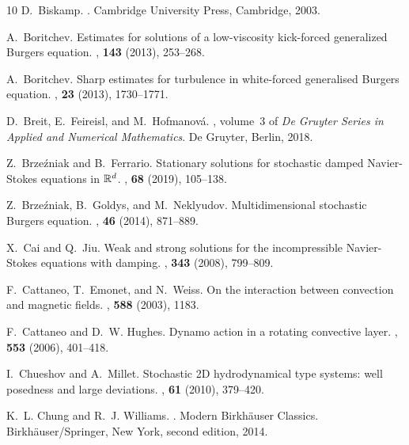 \documentclass[11pt, reqno]{amsart}
\theoremstyle{definition}
\numberwithin{equation}{section}
\begin{document}
\begin{thebibliography}{10}
	D.~Biskamp.
	.
	\newblock Cambridge University Press, Cambridge, 2003.
	
	A.~Boritchev.
	\newblock Estimates for solutions of a low-viscosity kick-forced generalized
	{B}urgers equation.
	,  {\bf 143} (2013), 253--268.
	
	A.~Boritchev.
	\newblock Sharp estimates for turbulence in white-forced generalised {B}urgers
	equation.
	,  {\bf 23} (2013), 1730--1771.
	
	D.~Breit, E.~Feireisl, and M.~Hofmanov\'a.
	, volume~3 of
	{\em De Gruyter Series in Applied and Numerical Mathematics}.
	\newblock De Gruyter, Berlin, 2018.
	
	Z.~Brze\'zniak and B.~Ferrario.
	\newblock Stationary solutions for stochastic damped {N}avier-{S}tokes
	equations in {$\Bbb R^d$}.
	,  {\bf 68} (2019), 105--138.
	
	Z.~Brze{\'z}niak, B.~Goldys, and M.~Neklyudov.
	\newblock Multidimensional stochastic {B}urgers equation.
	,  {\bf 46} (2014), 871--889.
	
	X.~Cai and Q.~Jiu.
	\newblock Weak and strong solutions for the incompressible {N}avier-{S}tokes
	equations with damping.
	,  {\bf 343} (2008), 799--809.
	
	F.~Cattaneo, T.~Emonet, and N.~Weiss.
	\newblock On the interaction between convection and magnetic fields.
	,  {\bf 588} (2003), 1183.
	
	F.~Cattaneo and D.~W. Hughes.
	\newblock Dynamo action in a rotating convective layer.
	,  {\bf 553} (2006), 401--418.
	
	I.~Chueshov and A.~Millet.
	\newblock Stochastic 2{D} hydrodynamical type systems: well posedness and large
	deviations.
	,  {\bf 61} (2010), 379--420.
	
	K.~L. Chung and R.~J. Williams.
	.
	\newblock Modern Birkh\"auser Classics. Birkh\"auser/Springer, New York, second
	edition, 2014.
	

\end{thebibliography}
\end{document}
